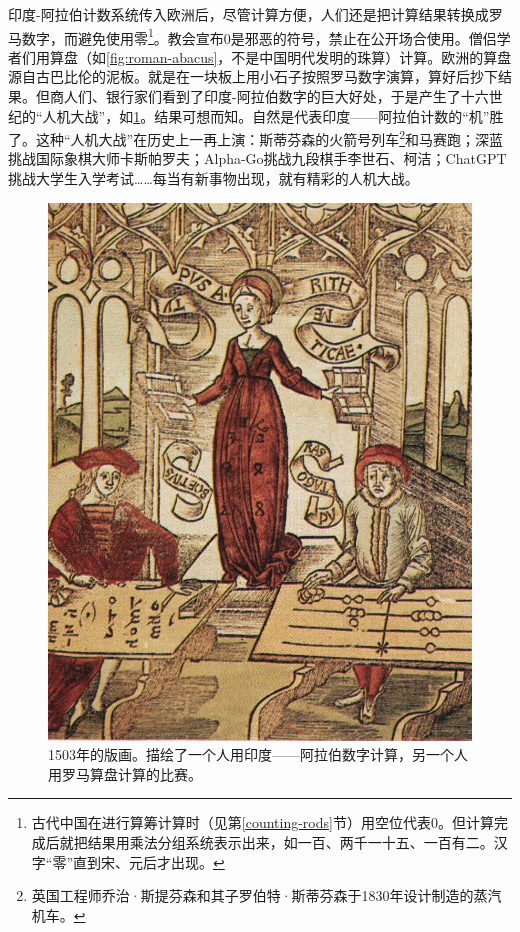 \documentclass[b5paper]{ctexart}
\begin{document}
印度-阿拉伯计数系统传入欧洲后，尽管计算方便，人们还是把计算结果转换成罗马数字，而避免使用零\footnote{古代中国在进行算筹计算时（见第\ref{counting-rods}节）用空位代表0。但计算完成后就把结果用乘法分组系统表示出来，如一百、两千一十五、一百有二。汉字“零”直到宋、元后才出现。}。教会宣布0是邪恶的符号，禁止在公开场合使用。僧侣学者们用算盘（如\cref{fig:roman-abacus}，不是中国明代发明的珠算）计算。欧洲的算盘源自古巴比伦的泥板。就是在一块板上用小石子按照罗马数字演算，算好后抄下结果。但商人们、银行家们看到了印度-阿拉伯数字的巨大好处，于是产生了十六世纪的“人机大战”，如\cref{fig:hindu-arabic-vs-abacus}。结果可想而知。自然是代表印度——阿拉伯计数的“机”胜了。这种“人机大战”在历史上一再上演：斯蒂芬森的火箭号列车\footnote{英国工程师乔治·斯提芬森和其子罗伯特·斯蒂芬森于1830年设计制造的蒸汽机车。}和马赛跑；深蓝挑战国际象棋大师卡斯帕罗夫；Alpha-Go挑战九段棋手李世石、柯洁；ChatGPT挑战大学生入学考试……每当有新事物出现，就有精彩的人机大战。

\begin{figure}[htbp]
 \centering
 \includegraphics[scale=0.8]{img/Hindu-arabic-vs-abacus}
 \caption{1503年的版画。描绘了一个人用印度——阿拉伯数字计算，另一个人用罗马算盘计算的比赛。}
 \label{fig:hindu-arabic-vs-abacus}
\end{figure}
\end{document}
